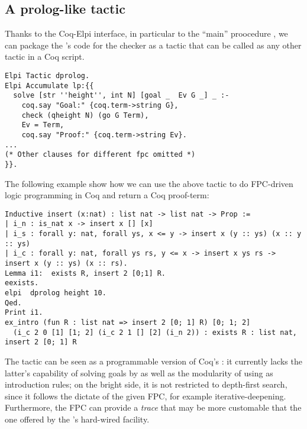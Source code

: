 

\subsection{A prolog-like tactic}


Thanks to the Coq-Elpi interface, in particular to the ``main''
proocedure , we can package the \lP's code for the checker
as a tactic that can be called as any other tactic in a Coq script.

\begin{lstlisting}
Elpi Tactic dprolog.
Elpi Accumulate lp:{{
  solve [str ''height'', int N] [goal _  Ev G _] _ :-
    coq.say "Goal:" {coq.term->string G},
    check (qheight N) (go G Term),
    Ev = Term,
    coq.say "Proof:" {coq.term->string Ev}.
...
(* Other clauses for different fpc omitted *)
}}.
\end{lstlisting}
The following example show how we can use the above tactic to do
FPC-driven logic programming in Coq and return a Coq proof-term:
\begin{lstlisting}
Inductive insert (x:nat) : list nat -> list nat -> Prop :=
| i_n : is_nat x -> insert x [] [x]
| i_s : forall y: nat, forall ys, x <= y -> insert x (y :: ys) (x :: y :: ys)
| i_c : forall y: nat, forall ys rs, y <= x -> insert x ys rs -> insert x (y :: ys) (x :: rs).
Lemma i1:  exists R, insert 2 [0;1] R.
eexists.
elpi  dprolog height 10.
Qed.
Print i1.
ex_intro (fun R : list nat => insert 2 [0; 1] R) [0; 1; 2]
  (i_c 2 0 [1] [1; 2] (i_c 2 1 [] [2] (i_n 2)) : exists R : list nat, insert 2 [0; 1] R
\end{lstlisting}

The  tactic can be seen as a programmable version of
Coq's : it currently lacks the latter's capability of
solving goals by  as well as the modularity of using
 as introduction rules; on the bright side, it is not
restricted to depth-first search, since it follows the dictate of the
given FPC, for example iterative-deepening. Furthermore, the FPC can
provide a \emph{trace} that may be more customable that the one
offered by the 's hard-wired  facility.
%

